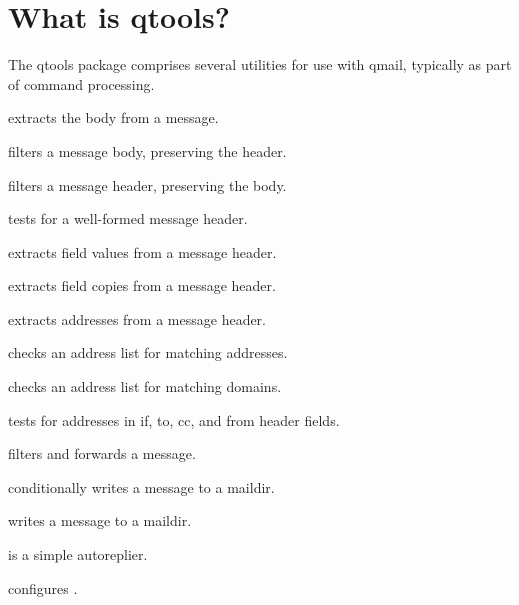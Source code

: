 \section{What is qtools?}
The qtools package comprises several utilities for use with qmail,
typically as part of  command processing.

 extracts the body from a message.

 filters a message body, preserving the header.

 filters a message header, preserving the body.

 tests for a well-formed message header.

 extracts field values from a message header.

 extracts field copies from a message header.

 extracts addresses from a message header.

 checks an address list for matching addresses.

 checks an address list for matching domains.

 tests for addresses in if, to, cc, and from header fields.

 filters and forwards a message.

 conditionally writes a message to a maildir.

 writes a message to a maildir.

 is a simple autoreplier.

 configures .

